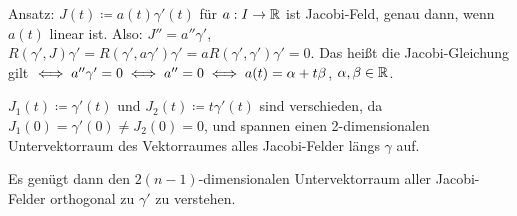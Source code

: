 \documentclass[a4paper,twoside,DIV15,BCOR12mm]{scrbook}
\renewcommand{\da}{\coloneqq}
\begin{document}
Ansatz: $J(t)\da a(t)\gamma'(t)$ für $a:I\to \mathbb{R}$ ist Jacobi-Feld, genau dann, wenn $a(t)$ linear ist. Also: $J''= a''\gamma'$, $R(\gamma',J)\gamma' = R(\gamma',a \gamma')\gamma' = a R(\gamma',\gamma')\gamma'= 0$. Das heißt die Jacobi-Gleichung gilt $\iff a''\gamma'=0 \iff a''=0 \iff a(t) = \alpha + t\beta$, $\alpha, \beta\in \mathbb{R}$.

\begin{folgerung*}
$J_1(t) \da \gamma'(t)$ und $J_2(t) \da t \gamma'(t)$ sind verschieden, da $J_1(0) = \gamma'(0) \ne J_2(0) = 0$, und spannen einen 2-dimensionalen Untervektorraum des Vektorraumes alles Jacobi-Felder längs $\gamma$ auf.

Es genügt dann den $2(n-1)$-dimensionalen Untervektorraum aller Jacobi-Felder orthogonal zu $\gamma'$ zu verstehen.
\end{folgerung*}
\end{document}
